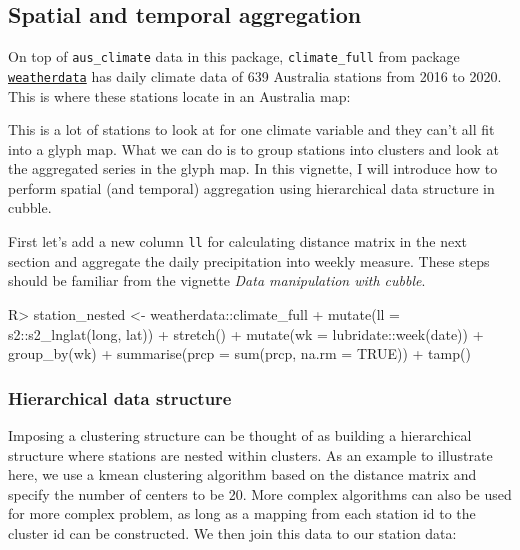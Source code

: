 \documentclass[
]{jss}
\begin{document}
\hypertarget{spatial-and-temporal-aggregation}{%
\subsection{Spatial and temporal
aggregation}\label{spatial-and-temporal-aggregation}}

On top of \texttt{aus\_climate} data in this package,
\texttt{climate\_full} from package
\href{https://github.com/huizezhang-sherry/weatherdata}{\texttt{weatherdata}}
has daily climate data of 639 Australia stations from 2016 to 2020. This
is where these stations locate in an Australia map:

This is a lot of stations to look at for one climate variable and they
can't all fit into a glyph map. What we can do is to group stations into
clusters and look at the aggregated series in the glyph map. In this
vignette, I will introduce how to perform spatial (and temporal)
aggregation using hierarchical data structure in cubble.

First let's add a new column \texttt{ll} for calculating distance matrix
in the next section and aggregate the daily precipitation into weekly
measure. These steps should be familiar from the vignette \emph{Data
manipulation with cubble}.

\begin{CodeChunk}
\begin{CodeInput}
R> station_nested <- weatherdata::climate_full %
+   mutate(ll = s2::s2_lnglat(long, lat)) %
+   stretch() %
+   mutate(wk = lubridate::week(date)) %
+   group_by(wk) %
+   summarise(prcp = sum(prcp, na.rm = TRUE)) %
+   tamp()
\end{CodeInput}
\end{CodeChunk}

\hypertarget{hierarchical-data-structure}{%
\subsubsection{Hierarchical data
structure}\label{hierarchical-data-structure}}

Imposing a clustering structure can be thought of as building a
hierarchical structure where stations are nested within clusters. As an
example to illustrate here, we use a kmean clustering algorithm based on
the distance matrix and specify the number of centers to be 20. More
complex algorithms can also be used for more complex problem, as long as
a mapping from each station id to the cluster id can be constructed. We
then join this data to our station data:
\end{document}
